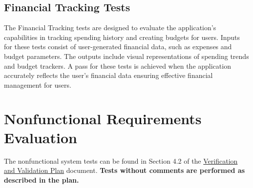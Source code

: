 \documentclass[12pt, titlepage]{article}
\begin{document}
\subsection{Financial Tracking Tests}
The Financial Tracking tests are designed to evaluate the application's capabilities in 
tracking spending history and creating budgets for users. Inputs for these tests consist 
of user-generated financial data, such as expenses and budget parameters. The outputs 
include visual representations of spending trends and budget trackers. A pass for these 
tests is achieved  when the application accurately reflects the user's financial data 
ensuring effective financial management for users.

\section{Nonfunctional Requirements Evaluation}

The nonfunctional system tests can be found in Section 4.2 of the
\href{https://github.com/PlutosCapstone/Plutos/blob/main/docs/VnVPlan/VnVPlan.pdf}{Verification
and Validation Plan} document. \textbf{Tests without comments are performed as
described in the plan.}
\end{document}
